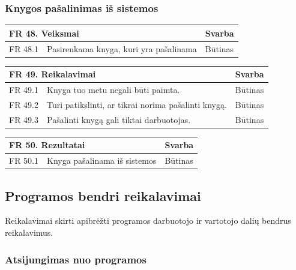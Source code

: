 \documentclass{VUMIFPSkursinis}
\begin{document}
  \subsubsection{Knygos pašalinimas iš sistemos}
  
  \noindent
 \vspace{5mm}
 \begin{tabular}{ | p{} | p{} | p{} |}
    \hline
        \multicolumn{2}{|l|}{   FR 48. Veiksmai} &Svarba  \\ \hline 
FR 48.1& Pasirenkama knyga, kuri yra pašalinama& Būtinas\\ \hline
    \end{tabular}
    \vspace{5mm}  
    \begin{tabular}{ | p{} | p{} | p{} |}
    \hline
     \multicolumn{2}{|l|}{   FR 49. Reikalavimai} &Svarba  \\ \hline 
FR 49.1 & Knyga tuo metu negali būti paimta.& Būtinas \\ \hline
FR 49.2 & Turi patikslinti, ar tikrai norima pašalinti knygą.&Būtinas\\ \hline
FR 49.3 &  Pašalinti knygą gali tiktai darbuotojas. &Būtinas\\ \hline
    \end{tabular}
    \vspace{5mm}
     \begin{tabular}{ | p{} | p{} | p{} |}
    \hline
     \multicolumn{2}{|l|}{ FR 50. Rezultatai } &Svarba  \\ \hline 
 FR 50.1& Knyga pašalinama iš sistemos& Būtinas\\ \hline

    \end{tabular}

 \subsection{Programos bendri reikalavimai}
 Reikalavimai skirti apibrėžti programos darbuotojo ir vartotojo dalių bendrus reikalavimus.
 \subsubsection{Atsijungimas nuo programos}
 
\end{document}
